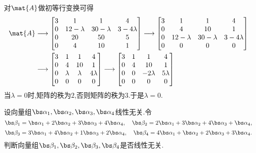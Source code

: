 \documentclass{ctexart}
\begin{document}
\begin{solution}
    对$\mat{A}$做初等行变换可得
    \[\begin{aligned}
        \mat{A}
        &\longrightarrow\begin{bmatrix}
            3&1&1&4\\
            0&12-\lambda&30-\lambda&3-4\lambda\\
            0&20&50&5\\
            0&4&10&1
        \end{bmatrix}\longrightarrow\begin{bmatrix}
            3&1&1&4\\
            0&4&10&1\\
            0&12-\lambda&30-\lambda&3-4\lambda\\
            0&0&0&0
        \end{bmatrix}\\
        &\longrightarrow\begin{bmatrix}
            3&1&1&4\\
            0&4&10&1\\
            0&\lambda&\lambda&4\lambda\\
            0&0&0&0
        \end{bmatrix}\longrightarrow\begin{bmatrix}
            3&1&1&4\\
            0&4&10&1\\
            0&0&-2\lambda&5\lambda\\
            0&0&0&0
        \end{bmatrix}
    \end{aligned}\]
    当$\lambda=0$时,矩阵的秩为$2$,否则矩阵的秩为$3$.于是$\lambda=0$.
\end{solution}
\begin{problem}
    设向量组$\bs\alpha_1,\bs\alpha_2,\bs\alpha_3,\bs\alpha_4$线性无关.令
    \[\bs\beta_1=\bs\alpha_1+2\bs\alpha_2+3\bs\alpha_3+4\bs\alpha_4,\quad\bs\beta_2=2\bs\alpha_1+3\bs\alpha_2+4\bs\alpha_3+\bs\alpha_4,\]
    \[\bs\beta_3=3\bs\alpha_1+4\bs\alpha_2+1\bs\alpha_3+2\bs\alpha_4,\quad\bs\beta_4=4\bs\alpha_1+\bs\alpha_2+2\bs\alpha_3+3\bs\alpha_4.\]
    判断向量组$\bs\beta_1,\bs\beta_2,\bs\beta_3,\bs\beta_4$是否线性无关.
\end{problem}
\end{document}

